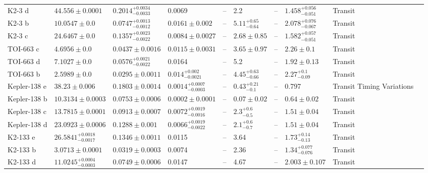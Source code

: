 \begin{tabular}{llllllllll}
K2-3 d & $44.556 \pm 0.0001$ & $0.2014^{+0.0034}_{-0.0033}$ & 0.0069 & -- & 2.2 & -- & $1.458^{+0.056}_{-0.051}$ & Transit & \cite{DIAMOND_LOWE_ET_AL__2022} \\
K2-3 b & $10.0547 \pm 0.0$ & $0.0747^{+0.0013}_{-0.0012}$ & $0.0161 \pm 0.002$ & -- & $5.11^{+0.65}_{-0.64}$ & -- & $2.078^{+0.076}_{-0.067}$ & Transit & \cite{DIAMOND_LOWE_ET_AL__2022} \\
K2-3 c & $24.6467 \pm 0.0$ & $0.1357^{+0.0023}_{-0.0022}$ & $0.0084 \pm 0.0027$ & -- & $2.68 \pm 0.85$ & -- & $1.582^{+0.057}_{-0.051}$ & Transit & \cite{DIAMOND_LOWE_ET_AL__2022} \\
TOI-663 c & $4.6956 \pm 0.0$ & $0.0437 \pm 0.0016$ & $0.0115 \pm 0.0031$ & -- & $3.65 \pm 0.97$ & -- & $2.26 \pm 0.1$ & Transit & \cite{COINTEPAS_ET_AL__2024} \\
TOI-663 d & $7.1027 \pm 0.0$ & $0.0576^{+0.0021}_{-0.0022}$ & 0.0164 & -- & 5.2 & -- & $1.92 \pm 0.13$ & Transit & \cite{COINTEPAS_ET_AL__2024} \\
TOI-663 b & $2.5989 \pm 0.0$ & $0.0295 \pm 0.0011$ & $0.014^{+0.002}_{-0.0021}$ & -- & $4.45^{+0.63}_{-0.66}$ & -- & $2.27^{+0.1}_{-0.09}$ & Transit & \cite{COINTEPAS_ET_AL__2024} \\
Kepler-138 e & $38.23 \pm 0.006$ & $0.1803 \pm 0.0014$ & $0.0014^{+0.0007}_{-0.0003}$ & -- & $0.43^{+0.21}_{-0.1}$ & -- & 0.797 & Transit Timing Variations & \cite{PIAULET_ET_AL_2023} \\
Kepler-138 b & $10.3134 \pm 0.0003$ & $0.0753 \pm 0.0006$ & $0.0002 \pm 0.0001$ & -- & $0.07 \pm 0.02$ & -- & $0.64 \pm 0.02$ & Transit & \cite{PIAULET_ET_AL_2023} \\
Kepler-138 c & $13.7815 \pm 0.0001$ & $0.0913 \pm 0.0007$ & $0.0072^{+0.0019}_{-0.0016}$ & -- & $2.3^{+0.6}_{-0.5}$ & -- & $1.51 \pm 0.04$ & Transit & \cite{PIAULET_ET_AL_2023} \\
Kepler-138 d & $23.0923 \pm 0.0006$ & $0.1288 \pm 0.001$ & $0.0066^{+0.0019}_{-0.0022}$ & -- & $2.1^{+0.6}_{-0.7}$ & -- & $1.51 \pm 0.04$ & Transit & \cite{PIAULET_ET_AL_2023} \\
K2-133 e & $26.5841^{+0.0018}_{-0.0017}$ & $0.1346 \pm 0.0011$ & 0.0115 & -- & 3.64 & -- & $1.73^{+0.14}_{-0.13}$ & Transit & \cite{WELLS_ET_AL__2019} \\
K2-133 b & $3.0713 \pm 0.0001$ & $0.0319 \pm 0.0003$ & 0.0074 & -- & 2.36 & -- & $1.34^{+0.077}_{-0.076}$ & Transit & \cite{WELLS_ET_AL__2019} \\
K2-133 d & $11.0245^{+0.0004}_{-0.0003}$ & $0.0749 \pm 0.0006$ & 0.0147 & -- & 4.67 & -- & $2.003 \pm 0.107$ & Transit & \cite{WELLS_ET_AL__2019} \\

\end{tabular}
